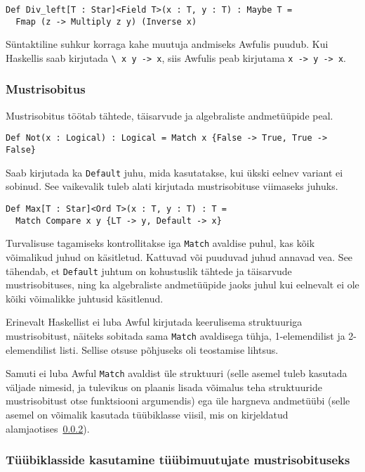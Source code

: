 \documentclass[12pt]{article}
\begin{document}
        \begin{verbatim}Def Div_left[T : Star]<Field T>(x : T, y : T) : Maybe T =
  Fmap (z -> Multiply z y) (Inverse x)\end{verbatim}

        Süntaktiline suhkur korraga kahe muutuja andmiseks Awfulis puudub. Kui Haskellis saab kirjutada \verb!\ x y -> x!, siis Awfulis peab kirjutama \verb!x -> y -> x!.
      \subsubsection{Mustrisobitus}\label{match}
        Mustrisobitus töötab tähtede, täisarvude ja algebraliste andmetüüpide peal.

        \begin{verbatim}Def Not(x : Logical) : Logical = Match x {False -> True, True -> False}\end{verbatim}

        Saab kirjutada ka \verb!Default! juhu, mida kasutatakse, kui ükski eelnev variant ei sobinud. See vaikevalik tuleb alati kirjutada mustrisobituse viimaseks juhuks.

        \begin{verbatim}Def Max[T : Star]<Ord T>(x : T, y : T) : T =
  Match Compare x y {LT -> y, Default -> x}\end{verbatim}

        Turvalisuse tagamiseks kontrollitakse iga \verb!Match! avaldise puhul, kas kõik võimalikud juhud on käsitletud. Kattuvad või puuduvad juhud annavad vea. See tähendab, et \verb!Default! juhtum on kohustuslik tähtede ja täisarvude mustrisobituses, ning ka algebraliste andmetüüpide jaoks juhul kui eelnevalt ei ole kõiki võimalikke juhtusid käsitlenud.

        Erinevalt Haskellist ei luba Awful kirjutada keerulisema struktuuriga mustrisobitust, näiteks sobitada sama \verb!Match! avaldisega tühja, 1-elemendilist ja 2-elemendilist listi. Sellise otsuse põhjuseks oli teostamise lihtsus.

        Samuti ei luba Awful \verb!Match! avaldist üle struktuuri (selle asemel tuleb kasutada väljade nimesid, ja tulevikus on plaanis lisada võimalus teha struktuuride mustrisobitust otse funktsiooni argumendis) ega üle hargneva andmetüübi (selle asemel on võimalik kasutada tüübiklasse viisil, mis on kirjeldatud alamjaotises~\ref{tyybiklassihakk}).
      \subsubsection{Tüübiklasside kasutamine tüübimuutujate mustrisobituseks}\label{tyybiklassihakk}
        
\end{document}
